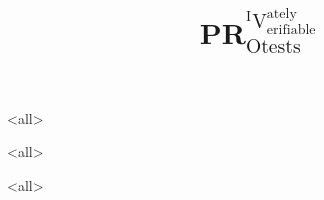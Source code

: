 \title[PRIVO\@: securely and PRIVately Verificable PROtests]{%
  PR$^{^{\text{I}}\text{V}^{\text{ately}}_\text{erifiable}}_{\text{Otests}}$%
}

\maketitle

\mode*

\begin{abstract}
  
\end{abstract}

\clearpage
\tableofcontents
\clearpage

\mode<all>


\mode<all>



\mode<all>




\begin{frame}[allowframebreaks]
  \printbibliography{}
\end{frame}
